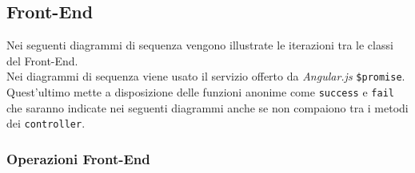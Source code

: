 \subsection{Front-End}
Nei seguenti diagrammi di sequenza vengono illustrate le iterazioni tra le classi del Front-End. \\
Nei diagrammi di sequenza viene usato il servizio offerto da \textit{Angular.js} \texttt{\$promise}. Quest'ultimo mette a disposizione delle funzioni anonime come \texttt{success} e \texttt{fail} che saranno indicate nei seguenti diagrammi anche se non compaiono tra i metodi dei \texttt{controller}.
\subsubsection{Operazioni Front-End}